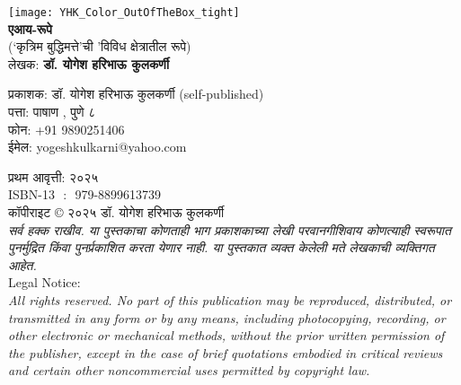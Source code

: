 \thispagestyle{empty}

\begin{center}
\texttt{[image: YHK\_Color\_OutOfTheBox\_tight]} \\[1.5em]

\textbf{\Huge एआय-रूपे}\\ [0.5em]
{\small(`कृत्रिम बुद्धिमत्ते'ची 'विविध क्षेत्रातील रूपे)}\\[0.5em]

लेखक: \textbf{{\large डॉ. योगेश हरिभाऊ कुलकर्णी}}\\[1.5em]
\end{center}

\vspace{3.5em}

\begin{flushleft}

प्रकाशक: डॉ. योगेश हरिभाऊ कुलकर्णी (self-published)\\
पत्ता:  पाषाण ,  पुणे ८ \\
फोन:  +91 9890251406\\
ईमेल: yogeshkulkarni@yahoo.com\\[1.5em]

\vspace{3.5em}

प्रथम आवृत्ती: २०२५\\[0.5em]

ISBN-13 ‏ : ‎ 979-8899613739\\[0.5em]

कॉपीराइट © २०२५ डॉ. योगेश हरिभाऊ कुलकर्णी\\[0.5em]

{\textit{सर्व हक्क राखीव. या पुस्तकाचा कोणताही भाग प्रकाशकाच्या लेखी परवानगीशिवाय कोणत्याही स्वरूपात पुनर्मुद्रित किंवा पुनर्प्रकाशित करता येणार नाही.  या पुस्तकात व्यक्त केलेली मते लेखकाची व्यक्तिगत आहेत.}}\\[1.5em]

{\large Legal Notice:}\\
{\textit{All rights reserved. No part of this publication may be reproduced, distributed, or transmitted in any form or by any means, including photocopying, recording, or other electronic or mechanical methods, without the prior written permission of the publisher, except in the case of brief quotations embodied in critical reviews and certain other noncommercial uses permitted by copyright law.}}
\end{flushleft}
\vfill\null
\clearpage

